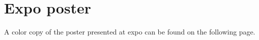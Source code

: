 \section{Expo poster}

A color copy of the poster presented at expo can be found on the following page.

\begin{figure}[p]
    \vspace*{-2.3cm}
\end{figure}
